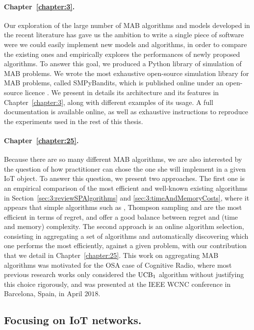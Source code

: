 \paragraph{Chapter~\ref{chapter:3}.}
%
Our exploration of the large number of MAB algorithms and models developed in the recent literature
has gave us the ambition to write a single piece of software were we could easily implement new models and algorithms, in order to compare the existing ones and empirically explores the performances of newly proposed algorithms.
To answer this goal, we produced a Python library of simulation of MAB problems.
%
We wrote the most exhaustive open-source simulation library for MAB problems, called SMPyBandits, which is published online under an open-source licence \cite{SMPyBandits,SMPyBanditsJMLR}.
We present in details its architecture and its features in Chapter~\ref{chapter:3}, along with different examples of its usage.
A full documentation is available online, as well as exhaustive instructions to reproduce the experiments used in the rest of this thesis.


\paragraph{Chapter~\ref{chapter:25}.}
%
Because there are so many different MAB algorithms, we are also interested by the question of how practitioner can chose the one she will implement in a given IoT object.
To answer this question, we present two approaches.
The first one is an empirical comparison of the most efficient and well-known existing algorithms in Section~\ref{sec:3:reviewSPAlgorithms} and \ref{sec:3:timeAndMemoryCosts}, where it appears that simple algorithms such as \UCB{} \cite{Auer02}, Thompson sampling \cite{Thompson33} and \klUCB{} \cite{KLUCBJournal} are the most efficient in terms of regret, and offer a good balance between regret and (time and memory) complexity.
The second approach is an online algorithm selection, consisting in aggregating a set of algorithms and automatically discovering which one performs the most efficiently, against a given problem, with our contribution \Aggr{} that we detail in Chapter~\ref{chapter:25}.
This work on aggregating MAB algorithms was motivated for the OSA case of Cognitive Radio, where most previous research works only considered the $\mathrm{UCB}_1$ algorithm without justifying this choice rigorously,
and was presented at the IEEE WCNC conference in Barcelona, Spain, in April $2018$.


\subsection{Focusing on IoT networks.}

